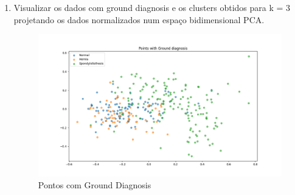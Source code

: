 \documentclass[a4paper,12pt]{article} %
\begin{document}
\begin{enumerate}
Código Utilizado:

\begin{lstlisting}[language=Python]
pca = PCA(n_components=2)
pca.fit(features_scaled)
X_pca = pca.transform(features_scaled)

print("Components (eigenvectors):\n",pca.components_)
print("Explained variance (eigenvalues) =",pca.explained_variance_)
print("Explained variance (ratio) =",pca.explained_variance_ratio_)

xvector = pca.components_[0] * max(X_pca[:,0])
yvector = pca.components_[1] * max(X_pca[:,1])

columns = features.columns
impt_features1 = {columns[i] : math.sqrt(xvector[i]**2) for i in range(len(columns))}
sorted_features1 = sorted(zip(impt_features1.values(),impt_features1.keys()),reverse=True)
print('Features sorted by importance for the first component: \n')
for i in range(len(sorted_features1)):
    print(f'{sorted_features1[i][1]} : {sorted_features1[i][0]: .5f}')

impt_features2 = {columns[i] : math.sqrt(yvector[i]**2) for i in range(len(columns))}
sorted_features2 = sorted(zip(impt_features2.values(),impt_features2.keys()),reverse=True)
print('\nFeatures sorted by importance for the second component: \n')
for i in range(len(sorted_features2)):
    print(f'{sorted_features2[i][1]} : {sorted_features2[i][0]: .5f}')

impt_features = {columns[i] : math.sqrt(xvector[i]**2 + yvector[i]**2) for i in range(len(columns))}
sorted_features = sorted(zip(impt_features.values(),impt_features.keys()),reverse=True)
print('\nFeatures sorted by importance: \n')
for i in range(len(sorted_features)):
    print(f'{sorted_features[i][1]} : {sorted_features[i][0]: .5f}')
    
\end{lstlisting}

\item Visualizar os dados com ground diagnosis e os clusters obtidos para k = 3 projetando os dados normalizados num espaço bidimensional PCA. \\

\begin{figure}[H]
      \centering
      \includegraphics[width=0.8\linewidth]{ex3_ground_diagnosis.png}
      \captionsetup{font=small} 
      \caption{Pontos com Ground Diagnosis}
\end{figure}


\end{enumerate}
\end{document}
